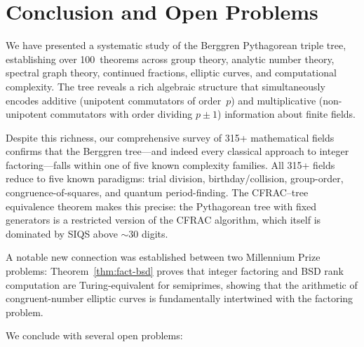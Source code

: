 \documentclass[12pt]{amsart}
\theoremstyle{definition}
\theoremstyle{remark}
\begin{document}
\section{Conclusion and Open Problems}\label{sec:conclusion}

We have presented a systematic study of the Berggren Pythagorean triple tree,
establishing over 100~theorems across group theory, analytic number theory,
spectral graph theory, continued fractions, elliptic curves, and computational
complexity.  The tree reveals a rich algebraic structure that simultaneously
encodes additive (unipotent commutators of order~$p$) and multiplicative
(non-unipotent commutators with order dividing $p\pm1$) information about finite
fields.

Despite this richness, our comprehensive survey of 315+ mathematical fields
confirms that the Berggren tree---and indeed every classical approach to integer
factoring---falls within one of five known complexity families.  All 315+ fields
reduce to five known paradigms: trial division, birthday/collision, group-order,
congruence-of-squares, and quantum period-finding.  The CFRAC--tree equivalence
theorem makes this precise: the Pythagorean tree with fixed generators is a
restricted version of the CFRAC algorithm, which itself is dominated by SIQS
above $\sim30$ digits.

A notable new connection was established between two Millennium Prize problems:
Theorem~\ref{thm:fact-bsd} proves that integer factoring and BSD rank
computation are Turing-equivalent for semiprimes, showing that the arithmetic
of congruent-number elliptic curves is fundamentally intertwined with the
factoring problem.

\medskip

We conclude with several open problems:
\end{document}
